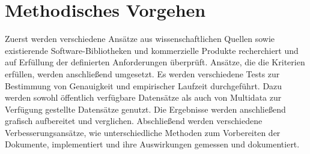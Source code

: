 \section{Methodisches Vorgehen}
\label{sec:methodisches-vorgehen}

Zuerst werden verschiedene Ansätze aus wissenschaftlichen Quellen sowie existierende Software-Bibliotheken und kommerzielle Produkte recherchiert und auf Erfüllung der definierten Anforderungen überprüft. Ansätze, die die Kriterien erfüllen, werden anschließend umgesetzt. Es werden verschiedene Tests zur Bestimmung von Genauigkeit und empirischer Laufzeit durchgeführt. Dazu werden sowohl öffentlich verfügbare Datensätze als auch von Multidata zur Verfügung gestellte Datensätze genutzt. Die Ergebnisse werden anschließend grafisch aufbereitet und verglichen. Abschließend werden verschiedene Verbesserungsansätze, wie unterschiedliche Methoden zum Vorbereiten der Dokumente, implementiert und ihre Auswirkungen gemessen und dokumentiert.